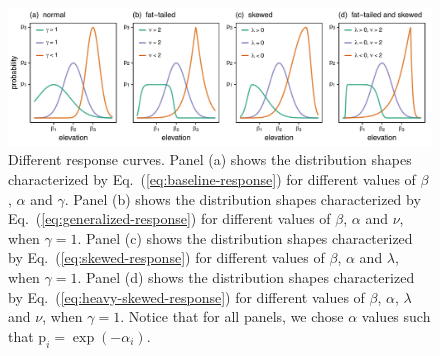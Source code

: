\documentclass[11pt, a4paper]{article}
\begin{document}
\begin{figure}[ht]
  \centering
    \includegraphics[width=1\textwidth]{figures/all-distributions}
	   \caption{Different response curves. Panel (a) shows the distribution shapes characterized by Eq.~(\ref{eq:baseline-response}) for different values of $\beta$, $\alpha$ and $\gamma$. Panel (b) shows the distribution shapes characterized by Eq.~(\ref{eq:generalized-response}) for different values of $\beta$, $\alpha$ and $\nu$, when $\gamma=1$. Panel (c) shows the distribution shapes characterized by Eq.~(\ref{eq:skewed-response}) for different values of $\beta$, $\alpha$ and $\lambda$, when $\gamma=1$. Panel (d) shows the distribution shapes characterized by Eq.~(\ref{eq:heavy-skewed-response}) for different values of $\beta$, $\alpha$, $\lambda$ and $\nu$, when $\gamma=1$. Notice that for all panels, we chose $\alpha$ values such that $\text{p}_i = \exp(-\alpha_i)$.
	   }
      \label{fig:response}
\end{figure}
\end{document}
